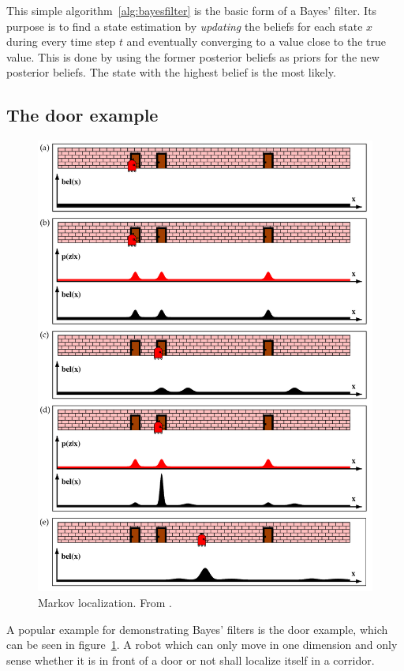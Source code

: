 \documentclass[Thesis.tex]{subfiles}
\begin{document}
This simple algorithm~\ref{alg:bayesfilter} is the basic form of a Bayes' filter. Its purpose is to find a state estimation by \emph{updating} the beliefs for each state $x$ during every time step $t$ and eventually converging to a value close to the true value. This is done by using the former posterior beliefs as priors for the new posterior beliefs.
The state with the highest belief is the most likely.

\subsection{The door example}
\begin{figure}
  \centering
  \includegraphics[width=.9\columnwidth]{pics/markov_localization}
  \caption{Markov localization. From \cite[p.~6]{ThrunBurgardFox:2005}.}
  \label{fig:markov_localization_one_dimension}
\end{figure}

A popular example for demonstrating Bayes' filters is the door example, which can be seen in figure~\ref{fig:markov_localization_one_dimension}. A robot which can only move in one dimension and only sense whether it is in front of a door or not shall localize itself in a corridor. 
\end{document}
